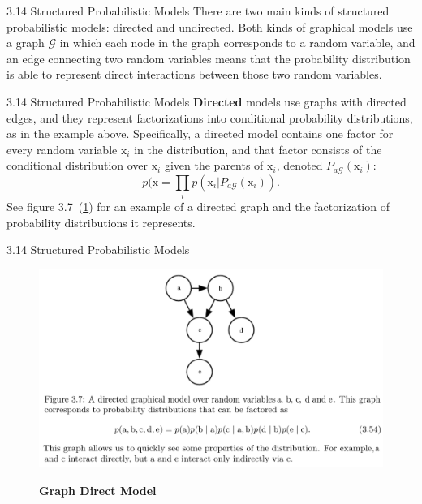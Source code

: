 \begin{frame}{3.14 Structured Probabilistic Models}
    \justifying
    There are two main kinds of structured probabilistic models: directed and undirected. Both kinds of graphical models use a graph $\mathcal{G}$ in which each node in the graph corresponds to a random variable, and an edge connecting two random variables means that the probability distribution is able to represent direct interactions between those two random variables.
\end{frame}

\begin{frame}{3.14 Structured Probabilistic Models}
    \justifying
    \textbf{Directed} models use graphs with directed edges, and they represent factorizations into conditional probability distributions, as in the example above. Specifically, a directed model contains one factor for every random variable $\mathrm{x}_{i}$ in the distribution, and that factor consists of the conditional distribution over $\mathrm{x}_{i}$ given the parents of $\mathrm{x}_{i}$, denoted $P_{a \mathcal{G}}(\mathrm{x}_{i})$:
    \begin{equation}
        p(\boldsymbol{\mathrm{x}} = \prod_{i}p(\mathrm{x}_{i} | P_{a \mathcal{G}}(\mathrm{x}_{i})).
    \end{equation}
    See figure 3.7~(\ref{fig:3_7graph1}) for an example of a directed graph and the factorization of probability distributions it represents.
\end{frame}

\begin{frame}{3.14 Structured Probabilistic Models}
    \begin{figure}
        \centering
        \includegraphics[scale=0.3]{images/3-7-graph_1.png}
        \label{fig:3_7graph1}
        \caption{\textbf{Graph Direct Model}}
    \end{figure}
\end{frame}

